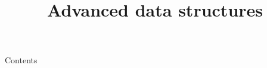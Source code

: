
\newcommand{\topic}{
	Advanced data structures
}

\title{\topic}
\supertitle{\course}
\date{}



\maketitle

\begin{frame}{Contents}
	\tableofcontents
\end{frame}




